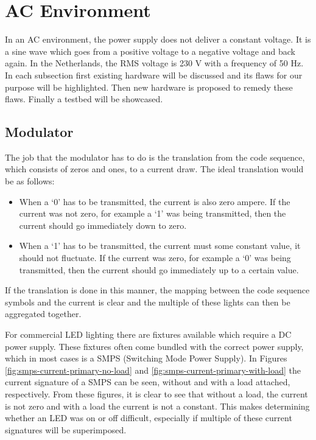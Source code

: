 
\section{AC Environment}
\label{sec:ac-environment}

In an AC environment, the power supply does not deliver a constant voltage.
It is a sine wave which goes from a positive voltage to a negative voltage and back again.
In the Netherlands, the RMS voltage is 230 V with a frequency of 50 Hz.
In each subsection first existing hardware will be discussed and its flaws for our purpose will be highlighted.
Then new hardware is proposed to remedy these flaws.
Finally a testbed will be showcased.





\subsection{Modulator}	

The job that the modulator has to do is the translation from the code sequence, which consists of zeros and ones, to a current draw.
The ideal translation would be as follows:

\begin{itemize}
	\item When a `0' has to be transmitted, the current is also zero ampere. 
	If the current was not zero, for example a `1' was being transmitted, then the current should go immediately down to zero.

	\item When a `1' has to be transmitted, the current must some constant value, it should not fluctuate. 
	If the current was zero, for example a `0' was being transmitted, then the current should go immediately up to a certain value.
\end{itemize}

If the translation is done in this manner, the mapping between the code sequence symbols and the current is clear and the multiple of these lights can then be aggregated together.

For commercial LED lighting there are fixtures available which require a DC power supply.
These fixtures often come bundled with the correct power supply, which in most cases is a SMPS (Switching Mode Power Supply).
In Figures \ref{fig:smps-current-primary-no-load} and \ref{fig:smps-current-primary-with-load} the current signature of a SMPS can be seen, without and with a load attached, respectively.
From these figures, it is clear to see that without a load, the current is not zero and with a load the current is not a constant.
This makes determining whether an LED was on or off difficult, especially if multiple of these current signatures will be superimposed.


